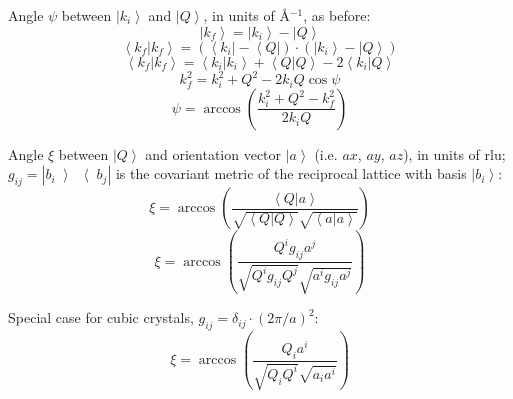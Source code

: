 \documentclass{article}
\begin{document}
Angle $\psi$ between $\left| k_i \right>$ and $\left| Q \right>$, in units of \AA{}$^{-1}$, as before:
\begin{equation} \left| k_f \right> = \left| k_i \right> - \left| Q \right> \end{equation}
\begin{equation} \left< k_f | k_f \right> = \left( \left< k_i \right| - \left< Q \right| \right) \cdot \left( \left| k_i \right> - \left| Q \right> \right) \end{equation}
\begin{equation} \left< k_f | k_f \right> = \left< k_i | k_i \right> + \left< Q | Q \right> - 2 \left< k_i | Q \right> \end{equation}
\begin{equation} k_f^2 = k_i^2 + Q^2 - 2 k_i Q \cos \psi \end{equation}
\begin{equation} \boxed{ \psi = \arccos \left( \frac{k_i^2 + Q^2 - k_f^2}{2 k_i Q} \right) } \end{equation}

Angle $\xi$ between $\left| Q \right>$ and orientation vector $\left| a \right>$ (i.e. $ax$, $ay$, $az$), in units of rlu; $g_{ij} = \left| b_i \left> \right< b_j \right|$ is the covariant metric of the reciprocal lattice with basis $\left| b_i \right>$:
\begin{equation} \xi = \arccos \left( \frac{ \left< Q | a \right> }{ \sqrt{\left< Q | Q \right>} \sqrt{\left< a | a \right>} } \right) \end{equation}
\begin{equation} \boxed{ \xi = \arccos \left( \frac{ Q^i g_{ij} a^j }{ \sqrt{Q^i g_{ij} Q^j} \sqrt{a^i g_{ij} a^j} } \right) } \end{equation}

Special case for cubic crystals, $g_{ij} = \delta_{ij} \cdot \left( 2\pi / a \right)^2$:
\begin{equation} \xi = \arccos \left( \frac{ Q_i a^i }{ \sqrt{Q_i Q^i} \sqrt{a_i a^i} } \right) \end{equation}
\end{document}
